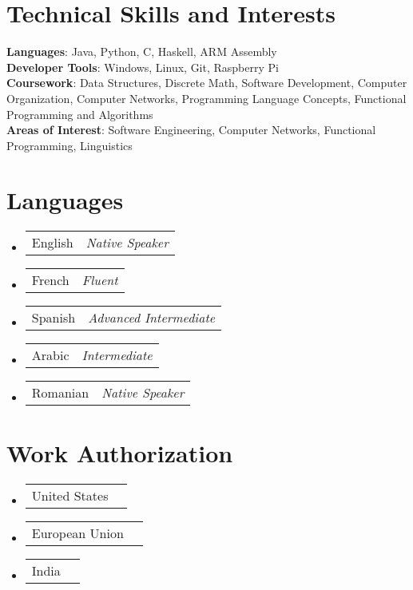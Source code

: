 \documentclass[a4paper,11pt]{article}
\makeatletter
\newcommand{\resumePOR}[3]{
\vspace{0.5mm}\item
    \begin{tabular*}{0.97\textwidth}[t]{l@{\extracolsep{\fill}}r}
        {#1}\hspace{0.3mm}#2 & \textit{\small{#3}} 
    \end{tabular*}
    \vspace{-2mm}
}
\newcommand{\resumeSubHeadingListStart}{\begin{itemize}[leftmargin=*,labelsep=0mm]}
\newcommand{\resumeSubHeadingListEnd}{\end{itemize}\vspace{2mm}}
\makeatother
\begin{document}
\section{\textbf{Technical Skills and Interests}}
 \begin{itemize}[leftmargin=0.05in, label={}]
    \small{\item{
     \textbf{Languages}{: Java, Python, C, Haskell, ARM Assembly } \\
       \textbf{Developer Tools}{: Windows, Linux, Git, Raspberry Pi } \\

     \textbf{Coursework}{: Data Structures, Discrete Math, Software Development, Computer Organization, Computer Networks, Programming Language Concepts, Functional Programming and Algorithms} \\

     \textbf{Areas of Interest}{: Software Engineering, Computer Networks, Functional Programming, Linguistics } \\
    }}
 \end{itemize}
 \vspace{-16pt}



\section{\textbf{Languages}}
\vspace{-0.4mm}
\resumeSubHeadingListStart
\resumePOR{English} %
    {} %
    {Native Speaker} %
\resumePOR{French } %
    {} %
    {Fluent} %
\resumePOR{Spanish } %
    {} %
    {Advanced Intermediate} %
\resumePOR{Arabic } %
    {} %
    {Intermediate} %
\resumePOR{Romanian } %
    {} %
    {Native Speaker} %
\resumeSubHeadingListEnd
\vspace{-5mm}




\section{\textbf{Work Authorization}}
\vspace{-0.4mm}
\resumeSubHeadingListStart
\resumePOR{United States } %
    {} %
    {} %
    
\resumePOR{European Union} %
    {} %
    {} %
\resumePOR{India } %
    {} %
    {} %
\resumeSubHeadingListEnd
\vspace{-5mm}



\end{document}
